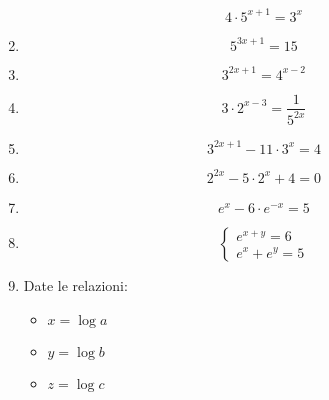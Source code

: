 \begin{enumerate}
\begin{equation*}
4\cdot 5^{x+1} = 3^x
\end{equation*}


\item 
\begin{equation*}
5^{3x+1}=15
\end{equation*}

\item 
\begin{equation*}
3^{2x+1}=4^{x-2}
\end{equation*}

\item 
\begin{equation*}
3\cdot 2^{x-3}=\frac{1}{5^{2x}}
\end{equation*}


\item 
\begin{equation*}
3^{2x+1}-11\cdot 3^x=4
\end{equation*}


\item
\begin{equation*}
2^{2x}-5 \cdot 2^x + 4 = 0
\end{equation*}

\item
\begin{equation*}
e^x-6\cdot e^{-x}=5
\end{equation*}

\item
\begin{equation*}
\left\{
\begin{array}{ll}
e^{x+y}=6\\
e^x+e^y=5
\end{array}
\right.
\end{equation*}

\item 

Date le relazioni:

\begin{itemize}
\item $x = \log a$
\item $y = \log b$
\item $z = \log c$
\end{itemize}


\end{enumerate}
